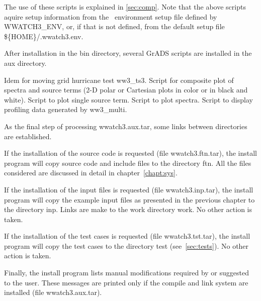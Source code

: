 \noindent
The use of these scripts is explained in \para\ref{sec:comp}.
Note that the above scripts aquire setup information from the \ws\ environment setup
file defined by {\file WWATCH3\_ENV}, or, if that is not defined, from the default
setup file {\file \$\{HOME\}/.wwatch3.env}.

\noindent
After installation in the {\dir bin} directory, several GrADS scripts are installed
in the {\dir aux} directory.

\begin{flist}
      {Idem for moving grid hurricane test {\file ww3\_ts3}.}
       {Script for composite plot of spectra and source
                       terms (2-D polar or Cartesian plots in color or in
                       black and white).}
      {Script to plot single source term.}
         {Script to plot spectra.}
      {Script to display profiling data generated by {\file
                       ww3\_multi}.} 
\end{flist}

\noindent
As the final step of processing {\file wwatch3.aux.tar}, some links between
directories are established.

If the installation of the source code is requested (file {\file
wwatch3.ftn.tar}), the install program will copy source code and include files
to the directory {\dir ftn}. All the files considered are discussed in detail
in chapter~\ref{chapt:sys}.

If the installation of the input files is requested (file {\file
wwatch3.inp.tar}), the install program will copy the example input files as
presented in the previous chapter to the directory {\dir inp}. Links are make
to the work directory {\dir work}. No other action is taken.

If the installation of the test cases is requested (file {\file
wwatch3.tst.tar}), the install program will copy the test cases to the
directory {\dir test} (see~\para\ref{sec:tests}). No other action is taken.

Finally, the install program lists manual modifications required by or
suggested to the user. These messages are printed only if the compile and link
system are installed (file {\file wwatch3.aux.tar}).


